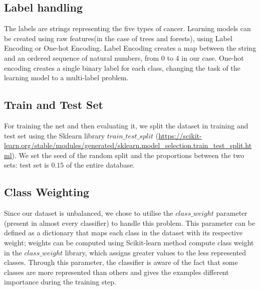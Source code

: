 \documentclass{article}
\begin{document}
\subsection{Label handling}
The labels are strings representing the five types of cancer. Learning models can be created using raw features(in the case of trees and forests), using Label Encoding or One-hot Encoding.
Label Encoding creates a map between the string and an ordered sequence of natural numbers, from 0 to 4 in our case.
One-hot encoding creates a single binary label for each class, changing the task of the learning model to a multi-label problem.



\subsection{Train and Test Set}

For training the net and then evaluating it, we split the dataset in training and test set using the Sklearn library $train\_test\_split$ (\url{https://scikit-learn.org/stable/modules/generated/sklearn.model_selection.train_test_split.html}). We set the seed of the random split and the proportions between the two sets: test set is $0.15$ of the entire database.


\subsection{Class Weighting}
Since our dataset is unbalanced, we chose to utilise the $class\_weight$ parameter (present in almost every classifier) to handle this problem. This parameter can be defined as a dictionary that maps each class in the dataset with its respective weight; weights can be computed using Scikit-learn method compute class weight in the $class\_weight$ library, which assigns greater values to the less represented classes. Through this parameter, the classifier is aware of the fact that some classes are more represented than others and gives the examples different importance during the training step.
\end{document}
